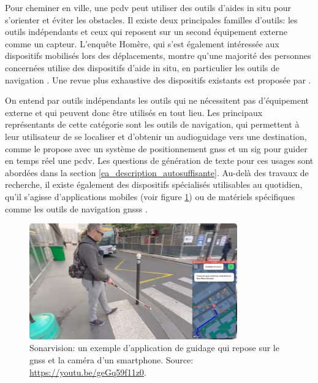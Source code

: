 Pour cheminer en ville, une \gls{pcdv} peut utiliser des outils d'aides in situ pour s'orienter et éviter les obstacles. Il existe deux principales familles d'outils: les outils indépendants et ceux qui reposent sur un second équipement externe comme un capteur. L'enquête Homère, qui s'est également intéressée aux dispositifs mobilisés lors des déplacements, montre qu'une majorité des personnes concernées utilise des dispositifs d'aide in situ, en particulier les outils de navigation \citep{homere_2023}. Une revue plus exhaustive des dispositifs existants est proposée par \citet{Kuriakose2022}.

\newpar{}

On entend par outils indépendants les outils qui ne nécessitent pas d'équipement externe et qui peuvent donc être utilisés en tout lieu. Les principaux représentants de cette catégorie sont les outils de navigation, qui permettent à leur utilisateur de se localiser et d'obtenir un audioguidage vers une destination, comme le propose \citet{Golledge1998} avec un système de positionnement \gls{gnss} et un \gls{sig} pour guider en temps réel une \gls{pcdv}. Les questions de génération de texte pour ces usages sont abordées dans la section \ref{ea_description_autosuffisante}. Au-delà des travaux de recherche, il existe également des dispositifs spécialisés utilisables au quotidien, qu'il s'agisse d'applications mobiles (voir figure \ref{fig:dispositif_in_situ}) ou de matériels spécifiques comme les outils de navigation \glspl{gnss} \citep{Refuveille2012}. 

\begin{figure}[ht]
    \centering
    \includegraphics[width=0.8\textwidth]{images/ea_dispositifs_in_situ.png}
    \caption[Application mobile de guidage]{Sonarvision: un exemple d'application de guidage qui repose sur le \gls{gnss} et la caméra d'un smartphone. Source: \url{https://youtu.be/geGq59f11z0}.}
    \label{fig:dispositif_in_situ}
\end{figure}

